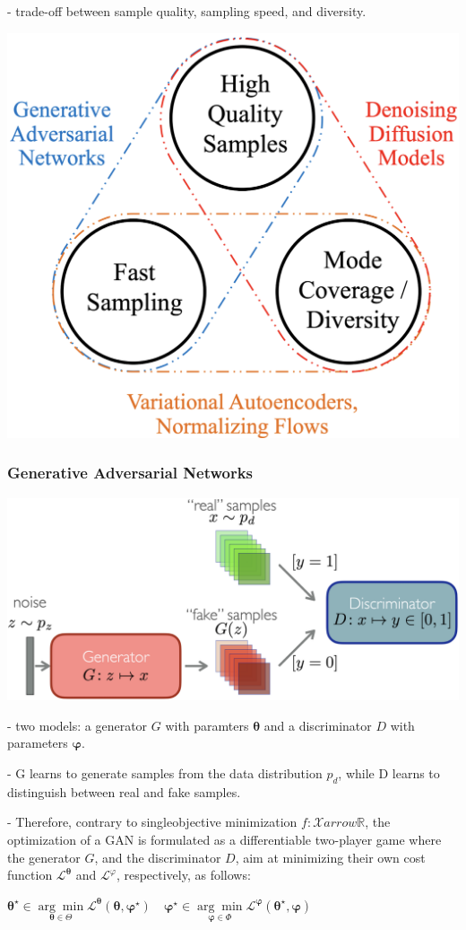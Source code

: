 - trade-off between sample quality, sampling speed, and diversity.

\includegraphics*[width=0.4\columnwidth]{figures/generative_pros_cons.png}


\subsubsection*{Generative Adversarial Networks}
\includegraphics*[width=0.9\columnwidth]{figures/generative_GAN.png}

- two models: a generator $G$ with paramters $\boldsymbol{\theta}$ and a discriminator $D$ with parameters $\boldsymbol{\varphi}$. 

- G learns to generate samples from the data distribution $p_{d}$, while D learns to distinguish between real and fake samples. 

- Therefore, contrary to singleobjective minimization $f: \mathcal{X} arrow \mathbb{R}$, the optimization of a GAN is formulated as a differentiable two-player game where the generator $G$, and the discriminator $D$, aim at minimizing their own cost function $\mathcal{L}^{\boldsymbol{\theta}}$ and $\mathcal{L}^{\varphi}$, respectively, as follows:

$\boldsymbol{\theta}^{\star} \in \underset{\boldsymbol{\theta} \in \Theta}{\arg \min } \mathcal{L}^{\boldsymbol{\theta}}(\boldsymbol{\theta}, \boldsymbol{\varphi}^{\star}) \quad \boldsymbol{\varphi}^{\star} \in \underset{\boldsymbol{\varphi} \in \Phi}{\arg \min } \mathcal{L}^{\boldsymbol{\varphi}}(\boldsymbol{\theta}^{\star}, \boldsymbol{\varphi})$


